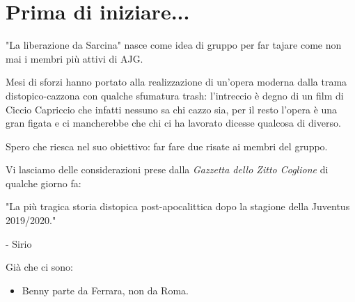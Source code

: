 \chapter*{Prima di iniziare...}
"La liberazione da Sarcina" nasce come idea di gruppo per far tajare come non mai i membri più attivi di AJG. 

Mesi di sforzi hanno portato alla realizzazione di un'opera moderna dalla trama distopico-cazzona con qualche sfumatura trash: l'intreccio è degno di un film di Ciccio Capriccio che infatti nessuno sa chi cazzo sia, per il resto l'opera è una gran figata e ci mancherebbe che chi ci ha lavorato dicesse qualcosa di diverso.

Spero che riesca nel suo obiettivo: far fare due risate ai membri del gruppo. 

Vi lasciamo delle considerazioni prese dalla \textit{Gazzetta dello Zitto Coglione} di qualche giorno fa:

\vspace*{2\baselineskip}
"La più tragica storia distopica post-apocalittica dopo la stagione della Juventus 2019/2020." 

- Sirio


Già che ci sono:
\begin{itemize}
\item Benny parte da Ferrara, non da Roma.
\end{itemize}
